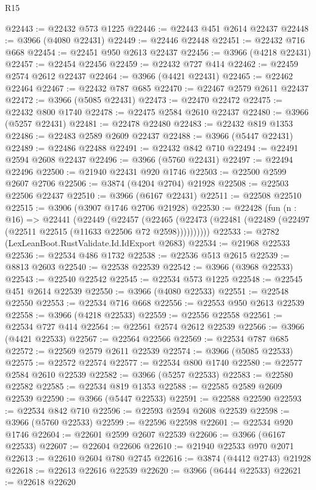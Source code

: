 \begin{lexlean}{R15}
\begin{coremodule}
@22443 := @22432 @573 @1225
@22446 := @22443 @451 @2614 @22437
@22448 := @3966 (@4080 @22431)
@22449 := @22446 @22448
@22451 := @22432 @716 @668
@22454 := @22451 @950 @2613 @22437
@22456 := @3966 (@4218 @22431)
@22457 := @22454 @22456
@22459 := @22432 @727 @414
@22462 := @22459 @2574 @2612 @22437
@22464 := @3966 (@4421 @22431)
@22465 := @22462 @22464
@22467 := @22432 @787 @685
@22470 := @22467 @2579 @2611 @22437
@22472 := @3966 (@5085 @22431)
@22473 := @22470 @22472
@22475 := @22432 @800 @1740
@22478 := @22475 @2584 @2610 @22437
@22480 := @3966 (@5257 @22431)
@22481 := @22478 @22480
@22483 := @22432 @819 @1353
@22486 := @22483 @2589 @2609 @22437
@22488 := @3966 (@5447 @22431)
@22489 := @22486 @22488
@22491 := @22432 @842 @710
@22494 := @22491 @2594 @2608 @22437
@22496 := @3966 (@5760 @22431)
@22497 := @22494 @22496
@22500 := @21940 @22431 @920 @1746
@22503 := @22500 @2599 @2607 @2706
@22506 := @3874 (@4204 @2704) @21928
@22508 := @22503 @22506 @22437
@22510 := @3966 (@6167 @22431)
@22511 := @22508 @22510
@22515 := @3906 (@3907 @1746 @2706 @21928)
@22530 := @22428
    (fun (n : @16) =>
    @22441
      (@22449
        (@22457
          (@22465 (@22473 (@22481 (@22489 (@22497 (@22511 @22515 (@11633 @22506 @72 @2598))))))))))
@22533 := @2782 (LexLeanBoot.RustValidate.Id.IdExport @2683)
@22534 := @21968 @22533
@22536 := @22534 @486 @1732
@22538 := @22536 @513 @2615
@22539 := @8813 @2603
@22540 := @22538 @22539
@22542 := @3966 (@3968 @22533)
@22543 := @22540 @22542
@22545 := @22534 @573 @1225
@22548 := @22545 @451 @2614 @22539
@22550 := @3966 (@4080 @22533)
@22551 := @22548 @22550
@22553 := @22534 @716 @668
@22556 := @22553 @950 @2613 @22539
@22558 := @3966 (@4218 @22533)
@22559 := @22556 @22558
@22561 := @22534 @727 @414
@22564 := @22561 @2574 @2612 @22539
@22566 := @3966 (@4421 @22533)
@22567 := @22564 @22566
@22569 := @22534 @787 @685
@22572 := @22569 @2579 @2611 @22539
@22574 := @3966 (@5085 @22533)
@22575 := @22572 @22574
@22577 := @22534 @800 @1740
@22580 := @22577 @2584 @2610 @22539
@22582 := @3966 (@5257 @22533)
@22583 := @22580 @22582
@22585 := @22534 @819 @1353
@22588 := @22585 @2589 @2609 @22539
@22590 := @3966 (@5447 @22533)
@22591 := @22588 @22590
@22593 := @22534 @842 @710
@22596 := @22593 @2594 @2608 @22539
@22598 := @3966 (@5760 @22533)
@22599 := @22596 @22598
@22601 := @22534 @920 @1746
@22604 := @22601 @2599 @2607 @22539
@22606 := @3966 (@6167 @22533)
@22607 := @22604 @22606
@22610 := @21940 @22533 @970 @2071
@22613 := @22610 @2604 @780 @2745
@22616 := @3874 (@4412 @2743) @21928
@22618 := @22613 @22616 @22539
@22620 := @3966 (@6444 @22533)
@22621 := @22618 @22620

\end{coremodule}
\end{lexlean}
